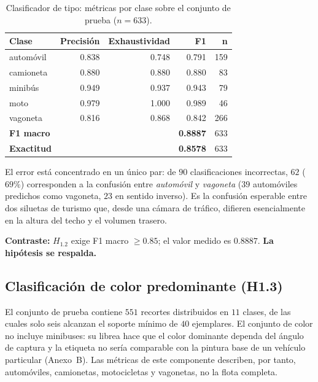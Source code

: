 \begin{table}[H]
    \centering
    \caption{Clasificador de tipo: métricas por clase sobre el conjunto de prueba
    ($n = 633$).}
    \begin{tabular}{lrrrr}
        \toprule
        \textbf{Clase} & \textbf{Precisión} & \textbf{Exhaustividad} & \textbf{F1} & \textbf{n} \\
        \midrule
        automóvil  & 0.838 & 0.748 & 0.791 & 159 \\
        camioneta  & 0.880 & 0.880 & 0.880 &  83 \\
        minibús    & 0.949 & 0.937 & 0.943 &  79 \\
        moto       & 0.979 & 1.000 & 0.989 &  46 \\
        vagoneta   & 0.816 & 0.868 & 0.842 & 266 \\
        \midrule
        \textbf{F1 macro} & \multicolumn{2}{c}{} & \textbf{0.8887} & 633 \\
        \textbf{Exactitud} & \multicolumn{2}{c}{} & \textbf{0.8578} & 633 \\
        \bottomrule
    \end{tabular}
\end{table}

El error está concentrado en un único par: de $90$ clasificaciones incorrectas,
$62$ ($69\%$) corresponden a la confusión entre \textit{automóvil} y
\textit{vagoneta} ($39$ automóviles predichos como vagoneta, $23$ en sentido
inverso). Es la confusión esperable entre dos siluetas de turismo que, desde una
cámara de tráfico, difieren esencialmente en la altura del techo y el volumen
trasero.

\textbf{Contraste:} $H_{1{.}2}$ exige F1 macro $\geq 0{.}85$; el valor medido es
$0{.}8887$. \textbf{La hipótesis se respalda.}

\subsection{Clasificación de color predominante (H1.3)}

El conjunto de prueba contiene $551$ recortes distribuidos en $11$ clases, de las
cuales solo seis alcanzan el soporte mínimo de $40$ ejemplares. El conjunto de
color no incluye minibuses: su librea hace que el color dominante dependa del
ángulo de captura y la etiqueta no sería comparable con la pintura base de un
vehículo particular (Anexo~B). Las métricas de este componente describen, por
tanto, automóviles, camionetas, motocicletas y vagonetas, no la flota completa.

